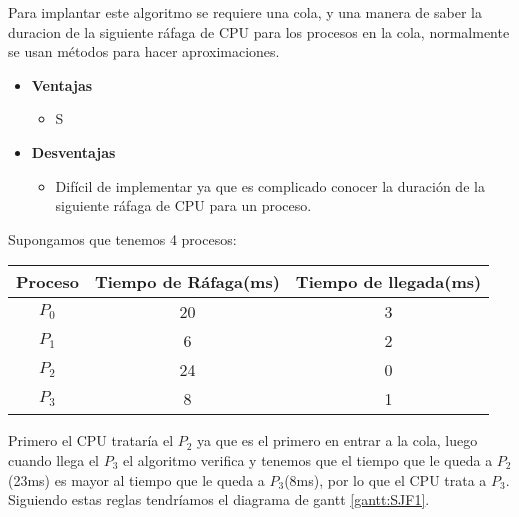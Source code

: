 \documentclass{article}
\begin{document}
Para implantar este algoritmo se requiere una cola, y una manera de saber la duracion de la siguiente ráfaga
de CPU para los procesos en la cola, normalmente se usan métodos para hacer aproximaciones.
\begin{itemize}
	\item \textbf{Ventajas}
	\begin{itemize}
		\item S
	\end{itemize}
	
	\item \textbf{Desventajas}
	\begin{itemize}
		\item Difícil de implementar ya que es complicado conocer la duración de la siguiente ráfaga
		de CPU para un proceso.
	\end{itemize}
\end{itemize}

Supongamos que tenemos 4 procesos:
\begin{center}
	\begin{tabular}{c|c|c}
		Proceso & Tiempo de Ráfaga(ms) & Tiempo de llegada(ms) \\ \hline
		$P_{0}$ & 20 & 3 \\ \hline
		$P_{1}$ & 6 & 2 \\ \hline
		$P_{2}$ & 24 & 0 \\ \hline
		$P_{3}$ & 8 & 1 \\
	\end{tabular}
\end{center}

Primero el CPU trataría el $P_{2}$ ya que es el primero en entrar a la cola,
luego cuando llega el $P_{3}$ el algoritmo verifica y tenemos que el tiempo que le queda
a $P_{2}$(23ms) es mayor al tiempo que le queda a $P_{3}$(8ms), por lo que el CPU trata a $P_{3}$.
Siguiendo estas reglas tendríamos el diagrama de gantt \ref{gantt:SJF1}.

\vspace{0.4cm}
\end{document}
